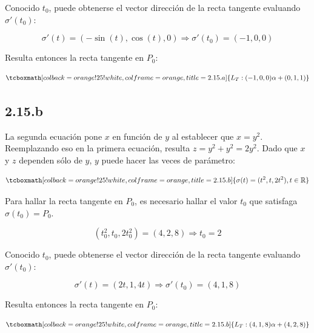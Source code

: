 \documentclass{article}
\renewcommand{\Bbb}{\mathbb}
\begin{document}
Conocido $t_0$, puede obtenerse el vector dirección de la recta tangente evaluando $\sigma'(t_0)$:

\begin{equation}
\sigma'(t) = (-\sin(t), \cos(t), 0) \Rightarrow \sigma'(t_0) = (-1, 0, 0)
\end{equation}

Resulta entonces la recta tangente en $P_0$:

\begin{equation}
\tcboxmath[colback=orange!25!white,colframe=orange,title=2.15.a]
{
L_T: (-1, 0, 0) \alpha + (0, 1, 1)
}
\end{equation}

\subsection*{2.15.b}
\label{subsec:2.15.b}

La segunda ecuación pone $x$ en función de $y$ al establecer que $x = y^2$. Reemplazando eso en la primera ecuación, resulta $z = y^2 + y^2 = 2y^2$. Dado que $x$ y $z$ dependen sólo de $y$, $y$ puede hacer las veces de parámetro:

\begin{equation}
\tcboxmath[colback=orange!25!white,colframe=orange,title=2.15.b]
{
\sigma(t) = (t^2, t, 2t^2), t \in \Bbb R
}
\end{equation}

Para hallar la recta tangente en $P_0$, es necesario hallar el valor $t_0$ que satisfaga $\sigma(t_0) = P_0$.

\begin{equation}
(t_0^2, t_0, 2t_0^2) = (4, 2, 8) \Rightarrow t_0 = 2
\end{equation}

Conocido $t_0$, puede obtenerse el vector dirección de la recta tangente evaluando $\sigma'(t_0)$:

\begin{equation}
\sigma'(t) = (2t, 1, 4t) \Rightarrow \sigma'(t_0) = (4, 1, 8)
\end{equation}

Resulta entonces la recta tangente en $P_0$:

\begin{equation}
\tcboxmath[colback=orange!25!white,colframe=orange,title=2.15.b]
{
L_T: (4, 1, 8) \alpha + (4, 2, 8)
}
\end{equation}
\end{document}
